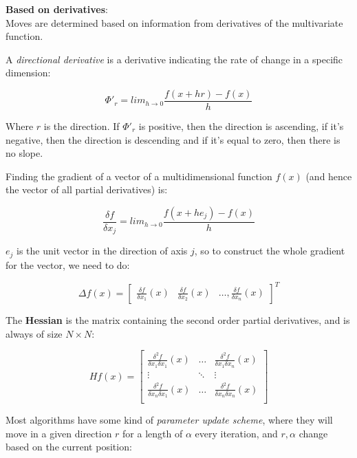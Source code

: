 \begin{description}
  \item \textbf{Based on derivatives}:\\
    Moves are determined based on information from derivatives of the 
    multivariate function.

    A \textit{directional derivative} is a derivative indicating the rate of
    change in a specific dimension:


    \[
      \Phi'_r = lim_{h \rightarrow 0}\frac{f(x + hr) - f(x)}{h}
    \]

    Where $r$ is the direction. If $\Phi'_r$ is positive, then the direction is
    ascending, if it's negative, then the direction is descending and if it's
    equal to zero, then there is no slope.

    Finding the gradient of a vector of a multidimensional function $f(x)$ (and
    hence the vector of all partial derivatives) is:

    \[
      \frac{\delta f}{\delta x_j} =
        lim_{h \rightarrow 0} \frac{f(x + he_j) - f(x)}{h}
    \]

    $e_j$ is the unit vector in the direction of axis $j$, so to construct the 
    whole gradient for the vector, we need to do:

    \[
      \Delta f(x) = \begin{bmatrix}
        \frac{\delta f}{\delta x_1}(x) & \frac{\delta f}{\delta x_2}(x) & \dots,
        \frac{\delta f}{\delta x_n}(x)
      \end{bmatrix}^{T}
    \]

    The \textbf{Hessian} is the matrix containing the second order partial
    derivatives, and is always of size $N \times N$:

    \[
      Hf(x) = \begin{bmatrix}
        \frac{\delta^2 f}{\delta x_1 \delta x_1}(x) & \dots &
          \frac{\delta^2 f}{\delta x_1 \delta x_n}(x)\\
        \vdots & \ddots & \vdots\\
        \frac{\delta^2 f}{\delta x_n \delta x_1}(x) & \dots &
          \frac{\delta^2 f}{\delta x_n \delta x_n}(x)\\
      \end{bmatrix}
    \]

    Most algorithms have some kind of \textit{parameter update scheme}, where
    they will move in a given direction $r$ for a length of $\alpha$ every
    iteration,  and $r, \alpha$ change based on the current position:


\end{description}
